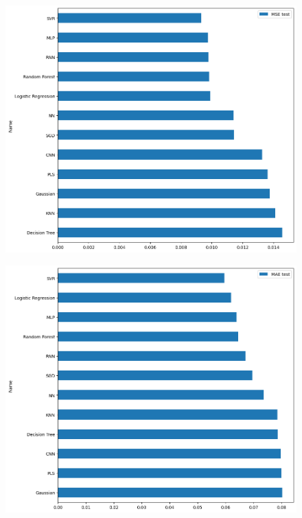 \begin{figure}[H]
    \centering
    \includegraphics[width=\textwidth]{images/mse_ranking.png}
    \caption{}
    \label{mse-ranking}
\end{figure}

\begin{figure}[H]
    \centering
    \includegraphics[width=\textwidth]{images/mae_ranking.png}
    \caption{}
    \label{mae-ranking}
\end{figure}

